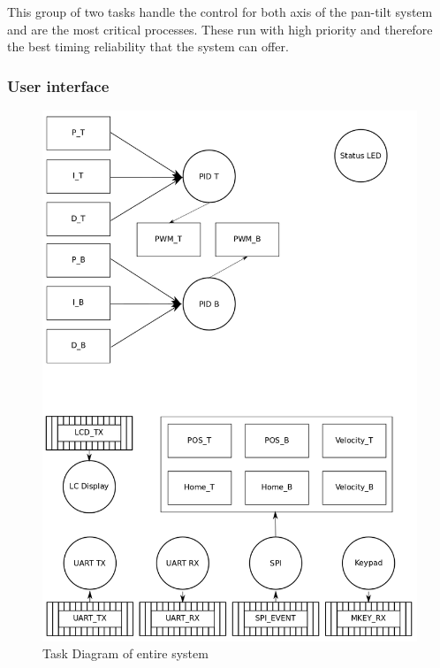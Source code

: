 \documentclass[../../../main]{subfiles}
\begin{document}
This group of two tasks handle the control for both axis of the pan-tilt system and are the most critical processes. These run with high priority and therefore the best timing reliability that the system can offer.

\subsubsection{User interface}


\begin{figure}[H]
\includegraphics[width=\columnwidth]{taskdiagram_full.png}
\caption{Task Diagram of entire system}
\label{fig:entire_task_diagram}
\end{figure}
\end{document}
